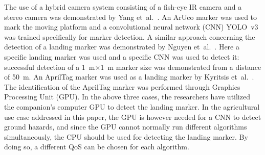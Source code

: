 \documentclass[conference]{IEEEtran}
\begin{document}




The use of a hybrid camera system consisting of a fish-eye IR camera
and a stereo camera was demonstrated by Yang
et~al.~\cite{yang2018hybrid}. An ArUco marker was used to mark the
moving platform and a convolutional neural network (CNN) YOLO~v3 was
trained specifically for marker detection. A similar approach
concerning the detection of a landing marker was demonstrated by
Nguyen et~al.~\cite{nguyen2018lightdenseyolo}. Here a specific landing
marker was used and a specific CNN was used to detect it: successful
detection of a \SI{1}{\m}$\times$\SI{1}{\m} marker size was demonstrated from a
distance of \SI{50}{\m}. An AprilTag marker was used as a landing marker by
Kyritsis et~al.~\cite{kyristsis2016towards}. The identification of the AprilTag marker
was performed through Graphics Processing Unit (GPU). In the above three cases, the researchers
have utilized the companion's computer GPU to detect the landing
marker. In the agricultural use case addressed in this paper, the GPU
is however needed for a CNN to detect ground hazards, and since the
GPU cannot normally run different algorithms simultaneously,
%
%
the CPU should be used for detecting the landing marker. By doing so,
a different QoS can be chosen for each algorithm.  
\end{document}
